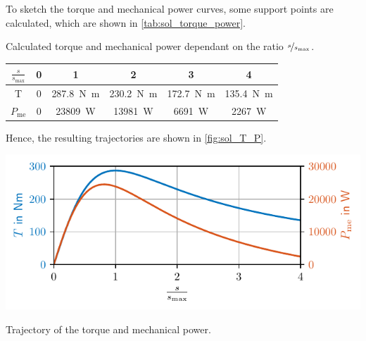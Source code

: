 \begin{solutionblock}
    To sketch the torque and mechanical power curves, some support points are calculated, which are shown in \autoref{tab:sol_torque_power}.
    \begin{solutiontable}[htb]
        \centering
        \caption{Calculated torque and mechanical power dependant on the ratio $\nicefrac{s}{s_{\mathrm{max}}}$.}
        \begin{tabular}{cccccc}\toprule
            $\frac{s}{s_{\mathrm{max}}}$ & 0 & 1 & 2 & 3 & 4 \\
            \midrule
            T & 0 & \SI{287.8}{\newton\metre} & \SI{230.2}{\newton\metre} & \SI{172.7}{\newton\metre} & \SI{135.4}{\newton\metre}\\
            $P_{\mathrm{me}}$ & 0 & \SI{23809}{\watt} & \SI{13981}{\watt} & \SI{6691}{\watt} & \SI{2267}{\watt} \\
            \bottomrule
        \end{tabular}
        \label{tab:sol_torque_power}
    \end{solutiontable}

    Hence, the resulting trajectories are shown in \autoref{fig:sol_T_P}.
    \begin{solutionfigure}[htb]
        \centering
        \includegraphics{fig/sol_T_P.pdf}
        \caption{Trajectory of the torque and mechanical power.}
        \label{fig:sol_T_P}
    \end{solutionfigure}


\end{solutionblock}




